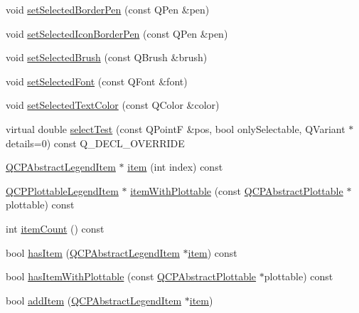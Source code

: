 \begin{DoxyCompactItemize}
\item 
void \mbox{\hyperlink{class_q_c_p_legend_a2c35d262953a25d96b6112653fbefc88}{set\+Selected\+Border\+Pen}} (const Q\+Pen \&pen)
\item 
void \mbox{\hyperlink{class_q_c_p_legend_ade93aabe9bcccaf9cf46cec22c658027}{set\+Selected\+Icon\+Border\+Pen}} (const Q\+Pen \&pen)
\item 
void \mbox{\hyperlink{class_q_c_p_legend_a875227f3219c9799464631dec5e8f1bd}{set\+Selected\+Brush}} (const Q\+Brush \&brush)
\item 
void \mbox{\hyperlink{class_q_c_p_legend_ab580a01c3c0a239374ed66c29edf5ad2}{set\+Selected\+Font}} (const Q\+Font \&font)
\item 
void \mbox{\hyperlink{class_q_c_p_legend_a7674dfc7a1f30e1abd1018c0ed45e0bc}{set\+Selected\+Text\+Color}} (const Q\+Color \&color)
\item 
virtual double \mbox{\hyperlink{class_q_c_p_legend_aa53507624491908fb3d1a514b1fc674e}{select\+Test}} (const Q\+PointF \&pos, bool only\+Selectable, Q\+Variant $\ast$details=0) const Q\+\_\+\+D\+E\+C\+L\+\_\+\+O\+V\+E\+R\+R\+I\+DE
\item 
\mbox{\hyperlink{class_q_c_p_abstract_legend_item}{Q\+C\+P\+Abstract\+Legend\+Item}} $\ast$ \mbox{\hyperlink{class_q_c_p_legend_acfe9694c45104a3359d3806ed366fcf7}{item}} (int index) const
\item 
\mbox{\hyperlink{class_q_c_p_plottable_legend_item}{Q\+C\+P\+Plottable\+Legend\+Item}} $\ast$ \mbox{\hyperlink{class_q_c_p_legend_a91e790002d8bf15a20628a8e8841e397}{item\+With\+Plottable}} (const \mbox{\hyperlink{class_q_c_p_abstract_plottable}{Q\+C\+P\+Abstract\+Plottable}} $\ast$plottable) const
\item 
int \mbox{\hyperlink{class_q_c_p_legend_a57ab86ab8b2a3762d4c1455eb5452c88}{item\+Count}} () const
\item 
bool \mbox{\hyperlink{class_q_c_p_legend_ad0f698e33db454a6c103b5206740e599}{has\+Item}} (\mbox{\hyperlink{class_q_c_p_abstract_legend_item}{Q\+C\+P\+Abstract\+Legend\+Item}} $\ast$\mbox{\hyperlink{class_q_c_p_legend_acfe9694c45104a3359d3806ed366fcf7}{item}}) const
\item 
bool \mbox{\hyperlink{class_q_c_p_legend_a4b90a442af871582df85c2bc13f91e88}{has\+Item\+With\+Plottable}} (const \mbox{\hyperlink{class_q_c_p_abstract_plottable}{Q\+C\+P\+Abstract\+Plottable}} $\ast$plottable) const
\item 
bool \mbox{\hyperlink{class_q_c_p_legend_a3ab274de52d2951faea45a6d975e6b3f}{add\+Item}} (\mbox{\hyperlink{class_q_c_p_abstract_legend_item}{Q\+C\+P\+Abstract\+Legend\+Item}} $\ast$\mbox{\hyperlink{class_q_c_p_legend_acfe9694c45104a3359d3806ed366fcf7}{item}})

\end{DoxyCompactItemize}
